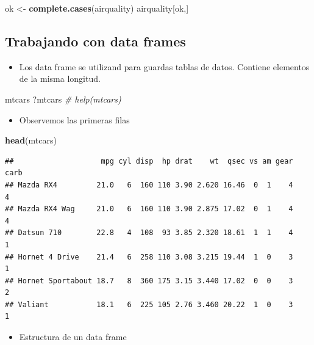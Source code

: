 \documentclass[]{article}
\def\tightlist{}
\newenvironment{Shaded}{\begin{snugshade}}{\end{snugshade}}
\newcommand{\KeywordTok}[1]{\textcolor[rgb]{0.13,0.29,0.53}{\textbf{{#1}}}}
\newcommand{\StringTok}[1]{\textcolor[rgb]{0.31,0.60,0.02}{{#1}}}
\newcommand{\CommentTok}[1]{\textcolor[rgb]{0.56,0.35,0.01}{\textit{{#1}}}}
\newcommand{\NormalTok}[1]{{#1}}
\numberwithin{equation}{section}
\begin{document}
\begin{Shaded}
\begin{Highlighting}[]
\NormalTok{ok <-}\StringTok{ }\KeywordTok{complete.cases}\NormalTok{(airquality)}
\NormalTok{airquality[ok,]}
\end{Highlighting}
\end{Shaded}

\subsection{Trabajando con data
frames}\label{trabajando-con-data-frames-1}

\begin{itemize}
\tightlist
\item
  Los data frame se utilizand para guardas tablas de datos. Contiene
  elementos de la misma longitud.
\end{itemize}

\begin{Shaded}
\begin{Highlighting}[]
\NormalTok{mtcars}
\NormalTok{?mtcars       }\CommentTok{# help(mtcars)}
\end{Highlighting}
\end{Shaded}

\begin{itemize}
\tightlist
\item
  Observemos las primeras filas
\end{itemize}

\begin{Shaded}
\begin{Highlighting}[]
\KeywordTok{head}\NormalTok{(mtcars)}
\end{Highlighting}
\end{Shaded}

\begin{verbatim}
##                    mpg cyl disp  hp drat    wt  qsec vs am gear carb
## Mazda RX4         21.0   6  160 110 3.90 2.620 16.46  0  1    4    4
## Mazda RX4 Wag     21.0   6  160 110 3.90 2.875 17.02  0  1    4    4
## Datsun 710        22.8   4  108  93 3.85 2.320 18.61  1  1    4    1
## Hornet 4 Drive    21.4   6  258 110 3.08 3.215 19.44  1  0    3    1
## Hornet Sportabout 18.7   8  360 175 3.15 3.440 17.02  0  0    3    2
## Valiant           18.1   6  225 105 2.76 3.460 20.22  1  0    3    1
\end{verbatim}

\begin{itemize}
\tightlist
\item
  Estructura de un data frame
\end{itemize}
\end{document}
